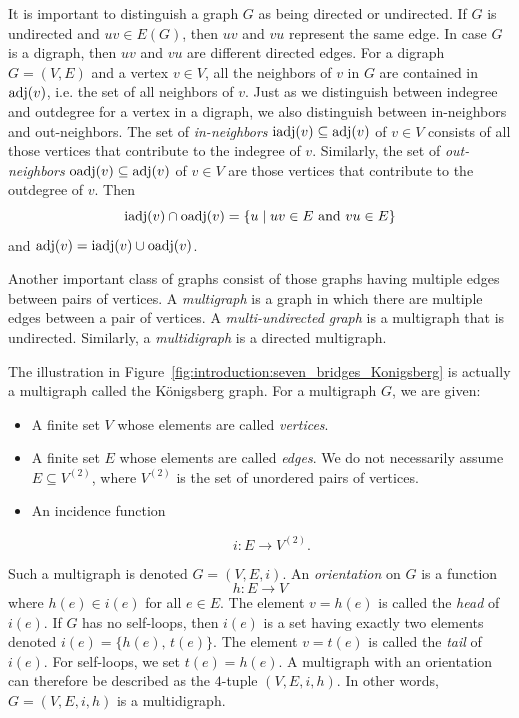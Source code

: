 It is important to distinguish a graph $G$ as being directed or
undirected. If $G$ is undirected and $uv \in E(G)$, then $uv$ and $vu$
represent the same edge. In case $G$ is a digraph, then $uv$ and $vu$
are different directed edges. For a digraph $G = (V, E)$ and a vertex
$v \in V$, all the neighbors of $v$ in $G$ are contained in $\operatorname*{adj}(v)$,
i.e. the set of all neighbors of $v$. Just as we distinguish between
indegree and outdegree for a vertex in a digraph, we also distinguish
between in-neighbors and out-neighbors. The set of \emph{in-neighbors}
$\operatorname*{iadj}(v) \subseteq \operatorname*{adj}(v)$ of $v \in V$ consists of all those
vertices that contribute to the indegree of $v$. Similarly, the set
of \emph{out-neighbors} $\operatorname*{oadj}(v) \subseteq \operatorname*{adj}(v)$ of $v \in V$ are
those vertices that contribute to the outdegree of $v$. Then
\[
\operatorname*{iadj}(v) \cap \operatorname*{oadj}(v)
=
\{u \;|\; uv \in E \text{ and } vu \in E\}
\]
and $\operatorname*{adj}(v) = \operatorname*{iadj}(v) \cup \operatorname*{oadj}(v)$.
\index{$\iadj$}
\index{$\oadj$}

Another important class of graphs consist of those graphs having
multiple edges between pairs of vertices. A \emph{multigraph} is a
graph in which there are multiple edges between a pair of vertices. A
\emph{multi-undirected graph} is a multigraph that is
undirected. Similarly, a \emph{multidigraph} is a directed
multigraph.

The illustration in
Figure~\ref{fig:introduction:seven_bridges_Konigsberg} is actually a
multigraph called the K\"onigsberg graph. For a multigraph $G$, we are
given:
%
\begin{itemize}
\item A finite set $V$ whose elements are called \emph{vertices}.

\item A finite set $E$ whose elements are called \emph{edges}. We do
  not necessarily assume $E \subseteq V^{(2)}$, where $V^{(2)}$ is the
  set of unordered pairs of vertices.

\item An incidence function

\begin{equation}
\label{eqn:edge-incidence}
i: E \longrightarrow V^{(2)}.
\end{equation}
\end{itemize}
%
Such a multigraph is denoted $G = (V,E,i)$. An \emph{orientation} on
$G$ is a function
%
\begin{equation}
\label{eqn:edge-orientation}
h: E \longrightarrow V
\end{equation}
%
where $h(e) \in i(e)$ for all $e \in E$. The element $v = h(e)$ is
called the \emph{head} of $i(e)$. If $G$ has no self-loops, then
$i(e)$ is a set having exactly two elements denoted
$i(e) = \{h(e),\, t(e)\}$. The element $v = t(e)$ is called the
\emph{tail} of $i(e)$. For self-loops, we set $t(e) = h(e)$. A
multigraph with an orientation can therefore be described as the
$4$-tuple $(V, E, i, h)$. In other words, $G = (V,E,i,h)$ is a
multidigraph.

